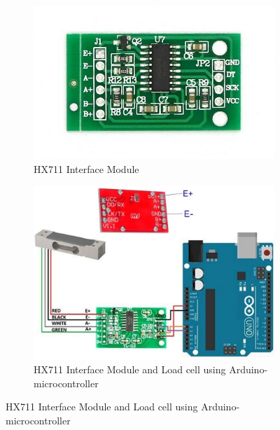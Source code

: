 \documentclass[../report.tex]{subfiles}
\begin{document}
\begin{figure}[h!]
  \centering
  \begin{subfigure}[b]{0.4\linewidth}
    \includegraphics[width=\linewidth]{image/HX711-Weighing-Sensor-Dual-Channel-24-Bit-Precision-A-D-Module-Pressure-Sensor_1.jpg}
    \caption{HX711 Interface Module }
  \end{subfigure}
  \begin{subfigure}[b]{0.4\linewidth}
    \includegraphics[width=\linewidth]{image/hx711-red.jpg}
    \caption{HX711 Interface Module and Load cell using Arduino-microcontroller}
  \end{subfigure}
  
  
\end{figure}
  
\end{document}
